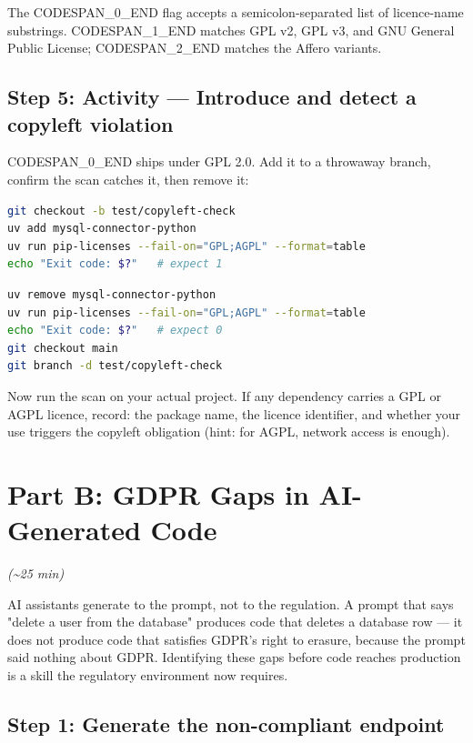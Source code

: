 \documentclass[11pt,a4paper]{book}
\begin{document}
The CODESPAN\_0\_END flag accepts a semicolon-separated list of licence-name substrings. CODESPAN\_1\_END matches GPL v2, GPL v3, and GNU General Public License; CODESPAN\_2\_END matches the Affero variants.

\subsection{Step 5: Activity --- Introduce and detect a copyleft violation}

CODESPAN\_0\_END ships under GPL 2.0. Add it to a throwaway branch, confirm the scan catches it, then remove it:

\begin{lstlisting}[language=Bash]
git checkout -b test/copyleft-check
uv add mysql-connector-python
uv run pip-licenses --fail-on="GPL;AGPL" --format=table
echo "Exit code: $?"   # expect 1
\end{lstlisting}

\begin{lstlisting}[language=Bash]
uv remove mysql-connector-python
uv run pip-licenses --fail-on="GPL;AGPL" --format=table
echo "Exit code: $?"   # expect 0
git checkout main
git branch -d test/copyleft-check
\end{lstlisting}

Now run the scan on your actual project. If any dependency carries a GPL or AGPL licence, record: the package name, the licence identifier, and whether your use triggers the copyleft obligation (hint: for AGPL, network access is enough).

\medskip

\section{Part B: GDPR Gaps in AI-Generated Code}

\textit{(\textasciitilde{}25 min)}

AI assistants generate to the prompt, not to the regulation. A prompt that says "delete a user from the database" produces code that deletes a database row --- it does not produce code that satisfies GDPR's right to erasure, because the prompt said nothing about GDPR. Identifying these gaps before code reaches production is a skill the regulatory environment now requires.

\subsection{Step 1: Generate the non-compliant endpoint}
\end{document}
